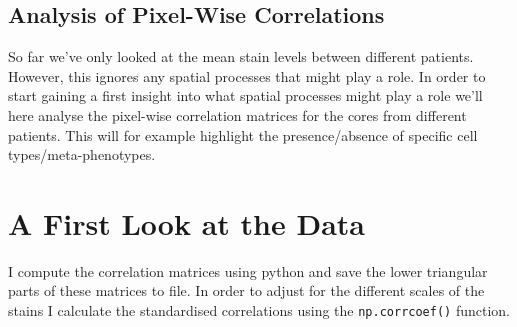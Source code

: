 \documentclass[a4paper]{article}\usepackage[]{graphicx}\usepackage[]{color}
\begin{document}
  \begin{center}
\section*{Analysis of Pixel-Wise Correlations}
\end{center}
So far we've only looked at the mean stain levels between different patients. However, this ignores any spatial processes that might play a role. In order to start gaining a first insight into what spatial processes might play a role we'll here analyse the pixel-wise correlation matrices for the cores from different patients. This will for example highlight the presence/absence of specific cell types/meta-phenotypes.

\section{A First Look at the Data}
I compute the correlation matrices using python and save the lower triangular parts of these matrices to file. In order to adjust for the different scales of the stains  I calculate the standardised correlations using the \texttt{np.corrcoef()} function.
\end{document}
